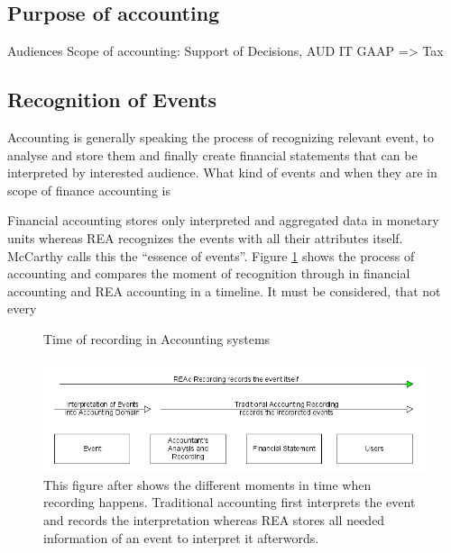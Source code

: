 
\subsection{Purpose of accounting}
Audiences
Scope of accounting: Support of Decisions, AUD IT GAAP => Tax
\subsection{Recognition of Events}

Accounting is generally speaking the process of recognizing relevant event, to analyse and store them and finally create financial statements that can be interpreted by interested audience.
What kind of events and when they are in scope of finance accounting is

Financial accounting stores only interpreted and aggregated data in monetary units whereas REA recognizes the events with all their attributes itself.
McCarthy calls this the \enquote{essence of events}.
Figure \ref{fig:EventsTimeOfRecording} shows the process of accounting and compares the moment of recognition through in financial accounting and REA accounting in a timeline.
It must be considered, that not every
\begin{figure}
	\centering
	\caption{Time of recording in Accounting systems}
	\label{fig:EventsTimeOfRecording}
	\includegraphics[width=0.7\linewidth]{"../figures/EventsTimeOfRecording"}
	\caption*{This figure after \cite{horngree1981nintrofinacc} shows the different moments in time when recording happens. Traditional accounting first interprets the event and records the interpretation whereas REA stores all needed information of an event to interpret it afterwords.}
\end{figure}

